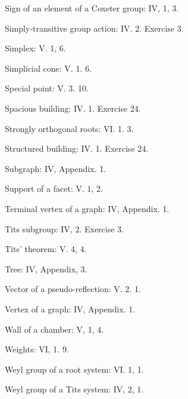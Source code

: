 Sign of an element of a Coxeter group: IV, 1, 3.

Simply-transitive group action: IV. 2. Exercise 3.

Simplex: V. 1, 6.

Simplicial cone: V. 1. 6.

Special point: V. 3. 10.

Spacious building: IV. 1. Exercise 24.

Strongly orthogonal roots: VI. 1. 3.

Structured building: IV. 1. Exercise 24.

Subgraph: IV, Appendix. 1.

Support of a facet: V. 1, 2.

Terminal vertex of a graph: IV, Appendix. 1.

Tits subgroup: IV, 2. Exercise 3.

Tits' theorem: V. 4, 4.

Tree: IV, Appendix, 3.

Vector of a pseudo-reflection: V. 2. 1.

Vertex of a graph: IV, Appendix. 1.

Wall of a chamber: V, 1, 4.

Weights: VI, 1. 9.

Weyl group of a root system: VI. 1, 1.

Weyl group of a Tits system: IV, 2, 1.

